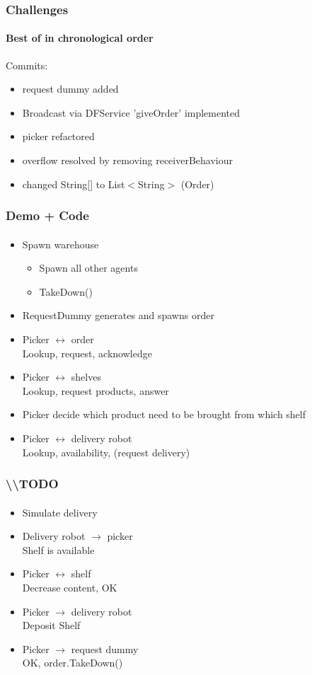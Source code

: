 \documentclass{beamer}
\begin{document}
\begin{frame}[fragile]
\frametitle{Challenges}
\framesubtitle{Best of in chronological order}

Commits:
\begin{itemize}
\item request dummy added
\item Broadcast via DFService 'giveOrder' implemented
\item picker refactored
\item overflow resolved by removing receiverBehaviour
\item changed String[] to List$<$String$>$ (Order)
\end{itemize}

\end{frame}

\begin{frame}[fragile]
\frametitle{Demo + Code}
\framesubtitle{}

\begin{itemize}
\item Spawn warehouse
	\begin{itemize}
	\item Spawn all other agents
	\item TakeDown()
	\end{itemize}
\item RequestDummy generates and spawns order
\item Picker $\leftrightarrow$ order\\
Lookup, request, acknowledge
\item Picker $\leftrightarrow$ shelves\\
Lookup, request products, answer
\item Picker decide which product need to be brought from which shelf
\item Picker $\leftrightarrow$  delivery robot\\
Lookup, availability, (request delivery)
\end{itemize}


\end{frame}


\begin{frame}[fragile]
\frametitle{\textbf{\textbackslash \textbackslash TODO}}
\framesubtitle{}

\begin{itemize}
\item Simulate delivery
\item Delivery robot $\rightarrow$ picker\\
Shelf is available
\item Picker $\leftrightarrow$ shelf\\
Decrease content, OK
\item Picker $\rightarrow$ delivery robot\\
Deposit Shelf
\item Picker $\rightarrow$ request dummy\\
OK, order.TakeDown()
\end{itemize}

\end{frame}
\end{document}
